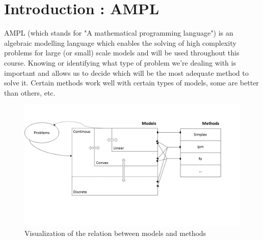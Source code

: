 
%
%

\section{Introduction : AMPL}

AMPL (which stands for "A mathematical programming language") is an algebraic modelling language which enables the solving of high complexity problems for large (or small) scale models and will be used throughout this course. Knowing or identifying what type of problem we're dealing with is important and allows us to decide which will be the most adequate method to solve it. Certain methods work well with certain types of models, some are better than others, etc. \\

\begin{figure}[h!]
\centering
\includegraphics[width=\textwidth]{./images/Course1_Slide1.JPG}
\caption{Visualization of the relation between models and methods}
\label{Figure1}
\end{figure} 

